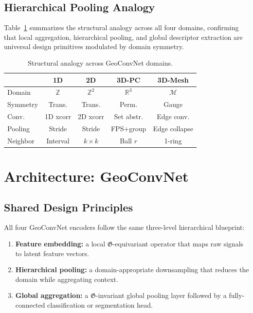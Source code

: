 \documentclass[10pt,conference]{IEEEtran}
\newcommand{\R}{\mathbb{R}}
\newcommand{\Z}{\mathbb{Z}}
\newcommand{\fG}{\mathfrak{G}}
\begin{document}
\subsection{Hierarchical Pooling Analogy}

Table~\ref{tab:analogy} summarizes the structural analogy across all four
domains, confirming that local aggregation, hierarchical pooling, and
global descriptor extraction are universal design primitives modulated by
domain symmetry.

\begin{table}[t]
  \renewcommand{\arraystretch}{1.2}
  \caption{Structural analogy across GeoConvNet domains.}
  \label{tab:analogy}
  \centering
  \begin{tabular}{lcccc}
    \toprule
    & \textbf{1D} & \textbf{2D} & \textbf{3D-PC} & \textbf{3D-Mesh} \\
    \midrule
    Domain      & $\Z$       & $\Z^2$        & $\R^3$          & $\mathcal{M}$ \\
    Symmetry    & Trans.     & Trans.        & Perm.           & Gauge         \\
    Conv.       & 1D xcorr   & 2D xcorr      & Set abstr.      & Edge conv.    \\
    Pooling     & Stride     & Stride        & FPS+group       & Edge collapse \\
    Neighbor    & Interval   & $k{\times}k$  & Ball $r$        & 1-ring        \\
    \bottomrule
  \end{tabular}
\end{table}

\section{Architecture: GeoConvNet}
\label{sec:architecture}

\subsection{Shared Design Principles}

All four GeoConvNet encoders follow the same three-level hierarchical
blueprint:
\begin{enumerate}
  \item \textbf{Feature embedding:} a local $\fG$-equivariant operator
    that maps raw signals to latent feature vectors.
  \item \textbf{Hierarchical pooling:} a domain-appropriate downsampling
    that reduces the domain while aggregating context.
  \item \textbf{Global aggregation:} a $\fG$-invariant global pooling
    layer followed by a fully-connected classification or segmentation head.
\end{enumerate}
\end{document}

